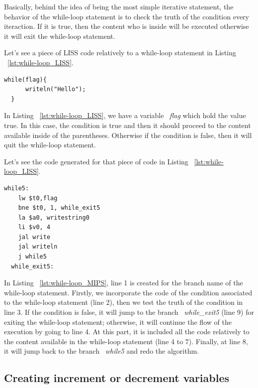 \documentclass[
  oneside,
  11pt, a4paper,
  footinclude=true,
  headinclude=true,
  cleardoublepage=empty
]{scrbook}
\begin{document}
Basically, behind the idea of being the most simple iterative statement, the behavior of the while-loop statement is to check the truth of the condition every iteraction. If it is true, then the content who is inside will be executed otherwise it will exit the while-loop statement.

Let's see a piece of LISS code relatively to a while-loop statement in Listing ~\ref{lst:while-loop_LISS}.

\begin{lstlisting}[caption={Example of a while-loop statement in LISS},label={lst:while-loop_LISS}]
  while(flag){
      writeln("Hello");
  }
\end{lstlisting}

In Listing ~\ref{lst:while-loop_LISS}, we have a variable ~\textit{flag} which hold the value true. In this case, the condition is true and then it should proceed to the content available inside of the parentheses. Otherwise if the condition is false, then it will quit the while-loop statement.

Let's see the code generated for that piece of code in Listing ~\ref{lst:while-loop_LISS}.

\begin{lstlisting}[caption={Code generated for the LISS code in Listing ~\ref{lst:while-loop_LISS}},label={lst:while-loop_MIPS}]
  while5:		
    lw $t0,flag		
    bne $t0, 1, while_exit5	
    la $a0, writestring0
    li $v0, 4
    jal write		
    jal writeln		
    j while5		
  while_exit5:		
\end{lstlisting}

In Listing ~\ref{lst:while-loop_MIPS}, line 1 is created for the branch name of the while-loop statement. Firstly, we incorporate the code of the condition associated to the while-loop statement (line 2), then we test the truth of the condition in line 3. If the condition is false, it will jump to the branch ~\textit{while\_exit5} (line 9) for exiting the while-loop statement; otherwise, it will continue the flow of the execution by going to line 4. At this part, it is included all the code relatively to the content available in the while-loop statement (line 4 to 7). Finally, at line 8, it will jump back to the branch ~\textit{while5} and redo the algorithm.

\subsection{Creating increment or decrement variables}
\end{document}

